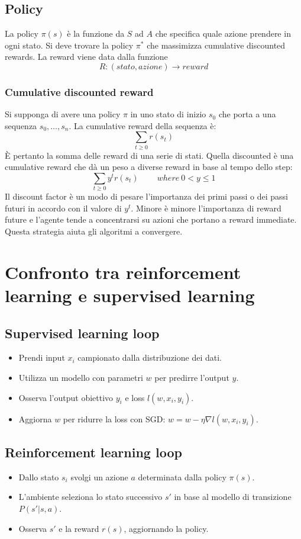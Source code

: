 	\subsection{Policy}
	La policy $\pi(s)$ \`e la funzione da $S$ ad $A$ che specifica quale azione prendere in ogni stato.
	Si deve trovare la policy $\pi^*$ che massimizza cumulative discounted rewards.
	La reward viene data dalla funzione
	$$R:(stato, azione)\rightarrow reward$$

		\subsubsection{Cumulative discounted reward}
		Si supponga di avere una policy $\pi$ in uno stato di inizio $s_0$ che porta a una sequenza $s_0,\dots, s_n$.
		La cumulative reward della sequenza \`e:
		$$\sum\limits_{t\ge 0} r(s_t)$$
		\`E pertanto la somma delle reward di una serie di stati.
		Quella discounted \`e una cumulative reward che d\`a un peso a diverse reward in base al tempo dello step:
		$$\sum\limits_{t\ge 0} y^tr(s_t)\qquad\ where\ 0 < y\le 1$$
		Il discount factor \`e un modo di pesare l'importanza dei primi passi o dei passi futuri in accordo con il valore di $y^t$.
		Minore \`e minore l'importanza di reward future e l'agente tende a concentrarsi su azioni che portano a reward immediate.
		Questa strategia aiuta gli algoritmi a convergere.

\section{Confronto tra reinforcement learning e supervised learning}

	\subsection{Supervised learning loop}
	\begin{itemize}
		\item Prendi input $x_i$ campionato dalla distribuzione dei dati.
		\item Utilizza un modello con parametri $w$ per predirre l'output $y$.
		\item Osserva l'output obiettivo $y_i$ e loss $l(w, x_i, y_i)$.
		\item Aggiorna $w$ per ridurre la loss con SGD: $w = w -\eta\nabla l(w, x_i, y_i)$.
	\end{itemize}

	\subsection{Reinforcement learning loop}
	\begin{itemize}
		\item Dallo stato $s_i$ svolgi un azione $a$ determinata dalla policy $\pi(s)$.
		\item L'ambiente seleziona lo stato successivo $s'$ in base al modello di transizione $P(s'|s,a)$.
		\item Osserva $s'$ e la reward $r(s)$, aggiornando la policy.
	\end{itemize}

